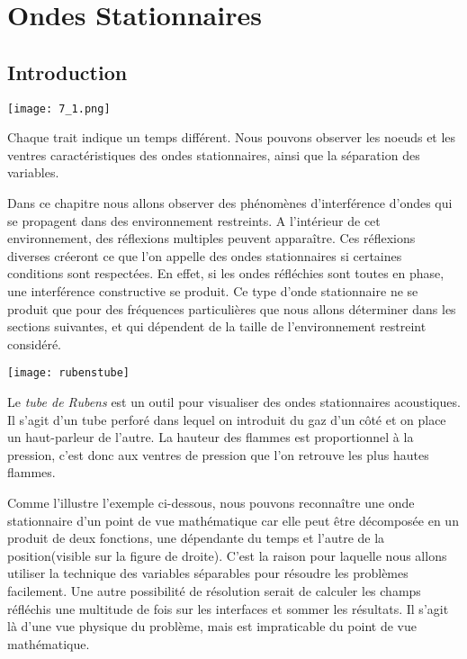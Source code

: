 \chapter{Ondes Stationnaires}
\section{Introduction}
\begin{marginfigure}[3cm]
\texttt{[image: 7\_1.png]}
\caption{Chaque trait indique un temps différent. Nous pouvons observer les noeuds et les ventres caractéristiques des ondes stationnaires, ainsi que la séparation des variables. }
\label{7_1}
\end{marginfigure}
Dans ce chapitre nous allons observer des phénomènes d'interférence d'ondes qui se propagent dans des environnement restreints.
A l'intérieur de cet environnement, des réflexions multiples peuvent apparaître. Ces réflexions diverses créeront ce que l'on appelle des ondes stationnaires si certaines conditions sont respectées.
En effet, si les ondes réfléchies sont toutes en phase, une interférence constructive se produit. Ce type d'onde stationnaire ne se produit que pour des fréquences particulières que nous allons déterminer dans les sections suivantes, et qui dépendent de la taille de l'environnement restreint considéré.
\begin{marginfigure}
\texttt{[image: rubenstube]}
\caption{Le \textit{tube de Rubens} est un outil pour visualiser des ondes stationnaires acoustiques. Il s'agit d'un tube perforé dans lequel on introduit du gaz d'un côté et on place un haut-parleur de l'autre. La hauteur des flammes est proportionnel à la pression, c'est donc aux ventres de pression que l'on retrouve les plus hautes flammes.  }
\end{marginfigure}
\par Comme l'illustre l'exemple ci-dessous, nous pouvons reconnaître une onde stationnaire d'un point de vue mathématique car elle peut être décomposée en un produit de deux fonctions, une dépendante du temps et l'autre de la position(visible sur la figure de droite). C'est la raison pour laquelle nous allons utiliser la technique des variables séparables pour résoudre les problèmes facilement. Une autre possibilité de résolution serait de calculer les champs réfléchis une multitude de fois sur les interfaces et sommer les résultats. Il s'agit là d'une vue physique du problème, mais est impraticable du point de vue mathématique.
